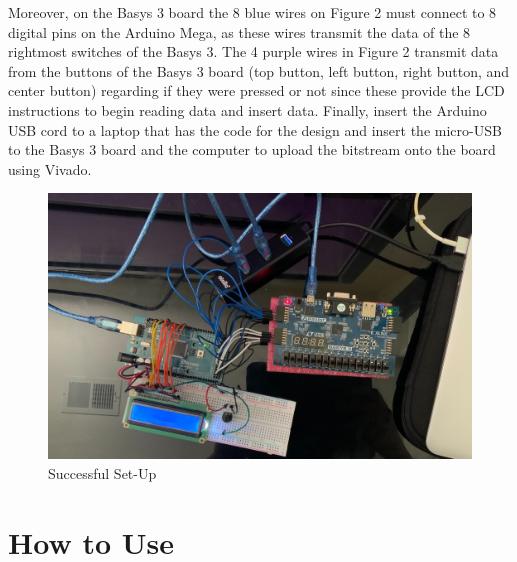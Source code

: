 \documentclass{article}
\begin{document}
Moreover, on the Basys 3 board the 8 blue wires on Figure 2 must 
connect to 8 digital pins on the Arduino Mega, as these 
wires transmit the data of the 8 rightmost switches 
of the Basys 3. The 4 purple wires in Figure 2 transmit data
from the buttons of the Basys 3 board (top button, left
button, right button, and center button) regarding if they
were pressed or not since these provide the 
LCD instructions to begin reading data and insert data. Finally, insert the Arduino USB cord to a laptop 
that has the code for the design and insert the micro-USB 
to the Basys 3 board and the computer to upload the bitstream
onto the board using Vivado.

\begin{figure} [ht!]
\centering
\includegraphics[width=0.7\linewidth]{SetUp.jpg}
  \caption{Successful Set-Up}
  \label{fig:fig3}
\end{figure}

\newpage

\section{How to Use}
\end{document}
